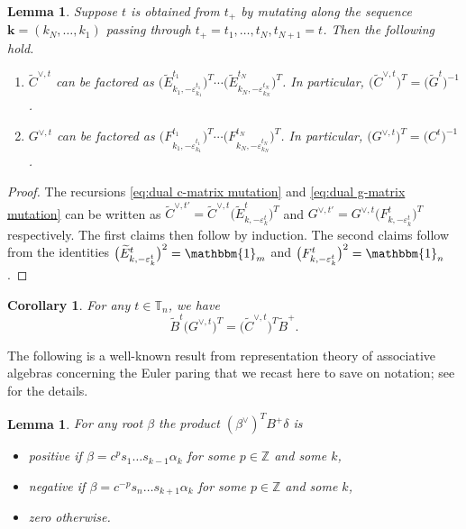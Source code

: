 \documentclass{amsart}
\newtheorem{corollary}[theorem]{Corollary}
\newtheorem{lemma}[theorem]{Lemma}
\numberwithin{theorem}{section}
\newcommand{\bfk}{{\boldsymbol{k}}}
\newcommand{\TT}{\mathbb{T}}
\newcommand{\ZZ}{\mathbb{Z}}
\newcommand{\bOne}{\mathbbm{1}}
\begin{document}
  \begin{lemma}
    Suppose $t$ is obtained from $t_+$ by mutating along the sequence $\bfk=(k_N,\ldots,k_1)$ passing through $t_+=t_1,\ldots,t_N,t_{N+1}=t$.
    Then the following hold.
    \begin{enumerate}
      \item $\widetilde C^{\vee,t}$ can be factored as $\big(\widetilde E^{t_1}_{k_1,-\varepsilon^{t_1}_{k_1}}\big)^T \cdots \big(\widetilde E^{t_N}_{k_N,-\varepsilon^{t_N}_{k_N}}\big)^T$.
        In particular, $\big(\widetilde C^{\vee,t}\big)^T=\big(\widetilde G^t\big)^{-1}$.
      \item $G^{\vee,t}$ can be factored as $\big(F^{t_1}_{k_1,-\varepsilon^{t_1}_{k_1}}\big)^T \cdots \big(F^{t_N}_{k_N,-\varepsilon^{t_N}_{k_N}}\big)^T$.
        In particular, $\big(G^{\vee,t}\big)^T=\big(C^t\big)^{-1}$.
    \end{enumerate}
  \end{lemma}
  \begin{proof}
    The recursions \eqref{eq:dual c-matrix mutation} and \eqref{eq:dual g-matrix mutation} can be written as $\widetilde C^{\vee,t'}=\widetilde C^{\vee,t} \big(\widetilde E^t_{k,-\varepsilon^t_k}\big)^T$ and $G^{\vee,t'}=G^{\vee,t} \big(F^t_{k,-\varepsilon^t_k}\big)^T$ respectively.
    The first claims then follow by induction.
    The second claims follow from the identities $\big(\widetilde E^t_{k,-\varepsilon^t_k}\big)^2=\bOne_m$ and $\big(F^t_{k,-\varepsilon^t_k}\big)^2=\bOne_n$.
  \end{proof}

  \begin{corollary}
    \label{cor:dual BG=CB}
    For any $t\in\TT_n$, we have
    \[\widetilde B^t \big(G^{\vee,t}\big)^T=\big(\widetilde C^{\vee,t}\big)^T \widetilde B^+.\]
  \end{corollary}

  The following is a well-known result from representation theory of associative algebras concerning the Euler paring that we recast here to save on notation; see \cite{dlab_ringel?} for the details.
  \begin{lemma}
    \label{le:euler pairing}
    For any root $\beta$ the product $(\beta^\vee)^T B^+ \delta$ is
    \begin{itemize}
      \item positive if $\beta = c^p s_1\dots s_{k-1}\alpha_k$ for some $p\in\ZZ$ and some $k$,
      \item negative if $\beta = c^{-p} s_n\dots s_{k+1}\alpha_k$ for some $p\in\ZZ$ and some $k$,
      \item zero otherwise.
    \end{itemize}
  \end{lemma}
\end{document}
